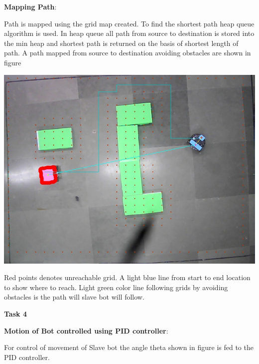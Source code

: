 \documentclass[report]{res}
\begin{document}
	\pagebreak	
	
	
	\textbf{Mapping Path}:
	
	Path is mapped using the grid map created. To find the shortest path heap queue algorithm is used. In heap queue all path from source to destination is stored into the min heap and shortest path is returned on the basis of shortest length of path. A path mapped from source to destination avoiding obstacles are shown in figure\\
	
	\begin{center}
		\includegraphics[scale = 0.7]{graphics/case1/path_route.jpeg}\\
	\end{center}
	
	Red points denotes unreachable grid. A light blue line from start to end location to show where to reach. Light green color line following grids by avoiding obstacles is the path will slave bot will follow.
	
	\pagebreak
	
	\begin{center}
		\textbf{\Huge Task 4} \\
	\end{center}
	\textbf{Motion of Bot controlled using PID controller}:
	
	For control of movement of Slave bot the angle theta shown in figure is fed to the PID controller.
	
\end{document}
